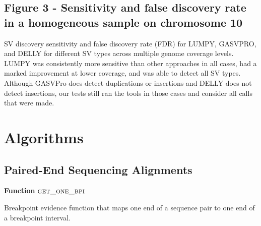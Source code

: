 \documentclass[10pt]{bmc_article}
\def\texttt{[image: ]}
\newenvironment{bmcformat}{\begin{raggedright}\baselineskip20pt\sloppy\setboolean{publ}{false}}{\end{raggedright}\baselineskip20pt\sloppy}
\begin{document}
\begin{bmcformat}
\subsection*{Figure 3 - Sensitivity and false discovery rate in a homogeneous
sample on chromosome 10}
SV discovery sensitivity and false discovery rate (FDR) for LUMPY, GASVPRO, and
DELLY for different SV types across multiple genome coverage levels.  LUMPY was
consistently more sensitive than other approaches in all cases, had a marked
improvement at lower coverage, and was able to detect all SV types.  Although
GASVPro does detect duplications or insertions and DELLY does not detect
insertions, our tests still ran the tools in those cases and consider all calls
that were made.


\section*{Algorithms}

\subsection*{Paired-End Sequencing Alignments}
\label{pe:sec}
\begin{algorithm}[H]
    \DontPrintSemicolon
    \footnotesize
    \BlankLine
    \textbf{Function} $\textsc{get\_one\_bpi}$\;
	\caption{Breakpoint evidence function that maps one end of a sequence pair
			to one end of a breakpoint interval.}
    \label{get_one_bpi}
\end{algorithm}


\end{bmcformat}
\end{document}
